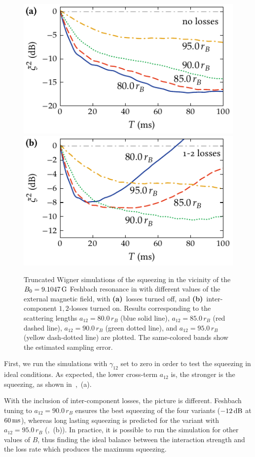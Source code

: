 \begin{figure}
    \centerline{%
    \includegraphics{figures_generated/bec_squeezing/feshbach_squeezing_no_losses.pdf}%
    \includegraphics{figures_generated/bec_squeezing/feshbach_squeezing.pdf}}

    \caption[Spin squeezing near a Feshbach resonance]{
    Truncated Wigner simulations of the squeezing in the vicinity of the $B_0 = 9.1047\mbox{\ensuremath{\,\mathrm{G}}}$ Feshbach resonance in \Rb{} with different values of the external magnetic field, with \textbf{(a)}~losses turned off, and \textbf{(b)}~inter-component $1,2$-losses turned on.
    Results corresponding to the scattering lengths $a_{12}=80.0\,r_B$ (blue solid line), $a_{12}=85.0\,r_B$ (red dashed line), $a_{12}=90.0\,r_B$ (green dotted line), and $a_{12}=95.0\,r_B$ (yellow dash-dotted line) are plotted.
    The same-colored bands show the estimated sampling error.}%

    \label{fig:bec-squeezing:feshbach:squeezing}
\end{figure}

First, we run the simulations with $\gamma_{12}$ set to zero in order to test the squeezing in ideal conditions.
As expected, the lower cross-term $a_{12}$ is, the stronger is the squeezing, as shown in~,~(a).

With the inclusion of inter-component losses, the picture is different.
Feshbach tuning to $a_{12} = 90.0\,r_B$ ensures the best squeezing of the four variants ($-12\mbox{\ensuremath{\,\mathrm{dB}}}$ at $60\mbox{\ensuremath{\,\mathrm{ms}}}$), whereas long lasting squeezing is predicted for the variant with $a_{12} = 95.0\,r_B$ (,~(b)).
In practice, it is possible to run the simulation for other values of $B$, thus finding the ideal balance between the interaction strength and the loss rate which produces the maximum squeezing.
